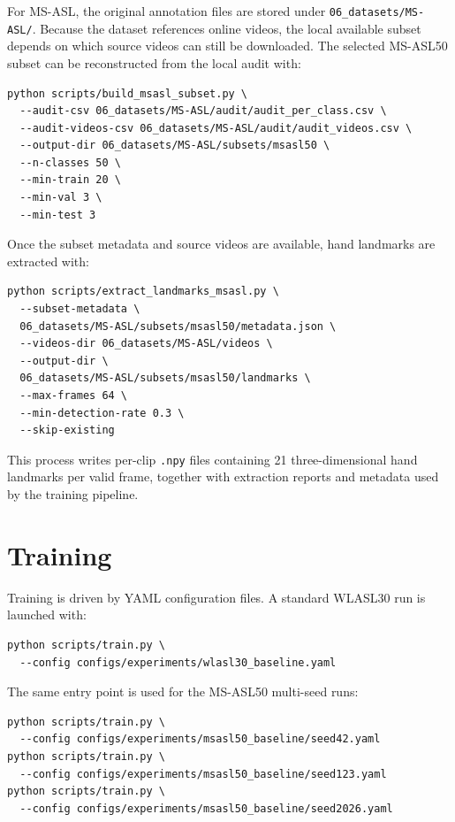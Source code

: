 For MS-ASL, the original annotation files are stored under \texttt{06\_datasets/MS-ASL/}. Because
the dataset references online videos, the local available subset depends on which source videos can
still be downloaded. The selected MS-ASL50 subset can be reconstructed from the local audit with:

\begin{verbatim}
python scripts/build_msasl_subset.py \
  --audit-csv 06_datasets/MS-ASL/audit/audit_per_class.csv \
  --audit-videos-csv 06_datasets/MS-ASL/audit/audit_videos.csv \
  --output-dir 06_datasets/MS-ASL/subsets/msasl50 \
  --n-classes 50 \
  --min-train 20 \
  --min-val 3 \
  --min-test 3
\end{verbatim}

Once the subset metadata and source videos are available, hand landmarks are extracted with:

\begin{verbatim}
python scripts/extract_landmarks_msasl.py \
  --subset-metadata \
  06_datasets/MS-ASL/subsets/msasl50/metadata.json \
  --videos-dir 06_datasets/MS-ASL/videos \
  --output-dir \
  06_datasets/MS-ASL/subsets/msasl50/landmarks \
  --max-frames 64 \
  --min-detection-rate 0.3 \
  --skip-existing
\end{verbatim}

This process writes per-clip \texttt{.npy} files containing 21 three-dimensional hand landmarks per
valid frame, together with extraction reports and metadata used by the training pipeline.

\section{Training}
\label{app:user_manual_training}

Training is driven by YAML configuration files. A standard WLASL30 run is launched with:

\begin{verbatim}
python scripts/train.py \
  --config configs/experiments/wlasl30_baseline.yaml
\end{verbatim}

The same entry point is used for the MS-ASL50 multi-seed runs:

\begin{verbatim}
python scripts/train.py \
  --config configs/experiments/msasl50_baseline/seed42.yaml
python scripts/train.py \
  --config configs/experiments/msasl50_baseline/seed123.yaml
python scripts/train.py \
  --config configs/experiments/msasl50_baseline/seed2026.yaml
\end{verbatim}

